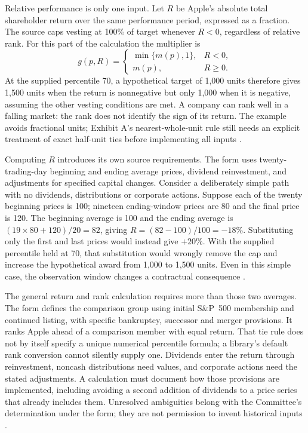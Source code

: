 Relative performance is only one input. Let $R$ be Apple's absolute total
shareholder return over the same performance period, expressed as a fraction.
The source caps vesting at 100\% of target whenever $R<0$, regardless of
relative rank. For this part of the calculation the multiplier is
\[
 g(p,R)=\begin{cases}\min\{m(p),1\},&R<0,\\m(p),&R\geq0.\end{cases}
\]
At the supplied percentile 70, a hypothetical target of 1,000 units therefore
gives 1,500 units when the return is nonnegative but only 1,000 when it is
negative, assuming the other vesting conditions are met. A company can rank
well in a falling market: the rank does not identify the sign of its return.
The example avoids fractional units; Exhibit A's nearest-whole-unit rule still
needs an explicit treatment of exact half-unit ties before implementing all
inputs \citep[Exhibit 10.3, Exhibit A]{apple2022plan}.

Computing $R$ introduces its own source requirements. The form uses
twenty-trading-day beginning and ending average prices, dividend reinvestment,
and adjustments for specified capital changes. Consider a deliberately simple
path with no dividends, distributions or corporate actions. Suppose each of
the twenty beginning prices is 100; nineteen ending-window prices are 80 and
the final price is 120. The beginning average is 100 and the ending average is
$(19\times80+120)/20=82$, giving $R=(82-100)/100=-18\%$. Substituting only
the first and last prices would instead give $+20\%$. With the supplied
percentile held at 70, that substitution would wrongly remove the cap and
increase the hypothetical award from 1,000 to 1,500 units. Even in this simple
case, the observation window changes a contractual consequence
\citep[Exhibit 10.3, Exhibit A, Beginning Price and Ending Price]{apple2022plan}.

The general return and rank calculation requires more than those two averages.
The form defines the comparison group using initial S\&P~500 membership and
continued listing, with specific bankruptcy, successor and merger provisions.
It ranks Apple ahead of a comparison member with equal return. That tie rule
does not by itself specify a unique numerical percentile formula; a library's
default rank conversion cannot silently supply one. Dividends enter the return
through reinvestment, noncash distributions need values, and corporate actions
need the stated adjustments. A calculation must document how those provisions
are implemented, including avoiding a second addition of dividends to a price
series that already includes them. Unresolved ambiguities belong with the
Committee's determination under the form; they are not permission to invent
historical inputs \citep[Exhibit 10.3, Exhibit A]{apple2022plan}.

